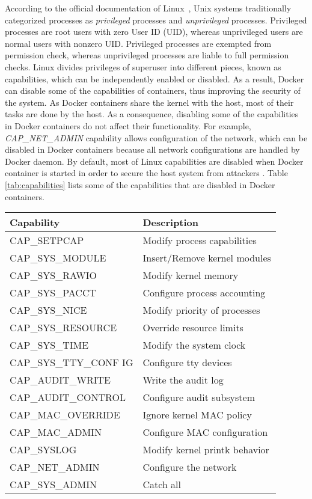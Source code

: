 According to the official documentation of Linux~\cite{man7},
Unix systems traditionally categorized processes as \textit{privileged} processes and
\textit{unprivileged} processes. Privileged processes are root users with
zero User ID (UID), whereas unprivileged users are normal users with nonzero
UID. Privileged processes are exempted from permission check, whereas
unprivileged processes are liable to full permission checks.
Linux divides privileges of superuser into different pieces, known as
capabilities, which can be independently enabled or disabled.
As a result, Docker can disable some of the capabilities of containers,
thus improving the security of the system. As Docker containers share the
kernel with the host, most of their tasks are done by the host. As a
consequence, disabling some of the capabilities in Docker containers do
not affect their functionality. For example, \textit{CAP\_NET\_ADMIN}
capability allows configuration of the network, which can be disabled in
Docker containers because all network configurations are handled by
Docker daemon. By default, most of Linux capabilities are disabled
when Docker container is started in order to secure the host system
from attackers \cite{walsh2}. Table \ref{tab:capabilities} lists some of the
capabilities that are disabled in Docker containers.
\newline
\begin{center}
\tabulinesep=1.2mm
\begin{longtable} {| p{} | p{} |}
\hline
	\textbf{Capability} & \textbf{Description} \\
\hline
 CAP\_SETPCAP & Modify process capabilities \\
 \hline
CAP\_SYS\_MODULE & Insert/Remove kernel modules \\
 \hline
CAP\_SYS\_RAWIO & Modify kernel memory \\
 \hline
CAP\_SYS\_PACCT & Configure process accounting \\
 \hline
CAP\_SYS\_NICE &  Modify priority of processes \\
 \hline
CAP\_SYS\_RESOURCE & Override resource limits \\
 \hline
CAP\_SYS\_TIME & Modify the system clock \\
 \hline
CAP\_SYS\_TTY\_CONF IG & Configure tty devices \\
 \hline
CAP\_AUDIT\_WRITE & Write the audit log \\
 \hline
CAP\_AUDIT\_CONTROL & Configure audit subsystem \\
 \hline
CAP\_MAC\_OVERRIDE & Ignore kernel MAC policy \\
 \hline
CAP\_MAC\_ADMIN & Configure MAC configuration \\
 \hline
CAP\_SYSLOG & Modify kernel printk behavior \\
 \hline
CAP\_NET\_ADMIN & Configure the network \\
 \hline
CAP\_SYS\_ADMIN & Catch all \\
 \hline
\end{longtable}
\label{tab:capabilities}
\end{center}

